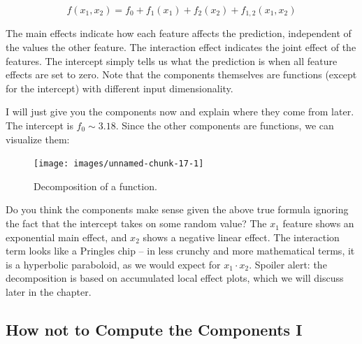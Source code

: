 \documentclass[
  12pt,
]{krantz}
\begin{document}
\[f(x_1, x_2) = f_0 + f_1(x_1) + f_2(x_2) + f_{1,2}(x_{1},x_{2})\]

The main effects indicate how each feature affects the prediction, independent of the values the other feature.
The interaction effect indicates the joint effect of the features.
The intercept simply tells us what the prediction is when all feature effects are set to zero.
Note that the components themselves are functions (except for the intercept) with different input dimensionality.

I will just give you the components now and explain where they come from later.
The intercept is \(f_0\sim3.18\).
Since the other components are functions, we can visualize them:

\begin{figure}

{\centering \texttt{[image: images/unnamed-chunk-17-1]} 

}

\caption{Decomposition of a function.}\label{fig:unnamed-chunk-17}
\end{figure}

Do you think the components make sense given the above true formula ignoring the fact that the intercept takes on some random value?
The \(x_1\) feature shows an exponential main effect, and \(x_2\) shows a negative linear effect.
The interaction term looks like a Pringles chip -- in less crunchy and more mathematical terms, it is a hyperbolic paraboloid, as we would expect for \(x_1 \cdot x_2\).
Spoiler alert: the decomposition is based on accumulated local effect plots, which we will discuss later in the chapter.

\hypertarget{how-not-to-compute-the-components-i}{%
\subsection{How not to Compute the Components I}\label{how-not-to-compute-the-components-i}}
\end{document}
